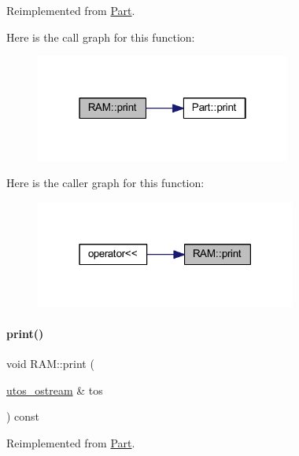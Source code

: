 Reimplemented from \mbox{\hyperlink{class_part_a4fa402b8e8fd4236ff773a7697ab2bc3}{Part}}.

Here is the call graph for this function\+:
\nopagebreak
\begin{figure}[H]
\begin{center}
\leavevmode
\includegraphics[width=238pt]{class_r_a_m_a2f226659cbc23f841d73525572ba9574_cgraph}
\end{center}
\end{figure}
Here is the caller graph for this function\+:
\nopagebreak
\begin{figure}[H]
\begin{center}
\leavevmode
\includegraphics[width=243pt]{class_r_a_m_a2f226659cbc23f841d73525572ba9574_icgraph}
\end{center}
\end{figure}
\mbox{\label{class_r_a_m_a11a874dd6cf99454efd6b7a1d20a3737}} 
\paragraph{\texorpdfstring{print()}{print()}\hspace{0.1cm}{\footnotesize\ttfamily [2/4]}}
{\footnotesize\ttfamily void R\+A\+M\+::print (\begin{DoxyParamCaption}\item[{\mbox{\hyperlink{structutos__ostream}{utos\+\_\+ostream}} \&}]{tos }\end{DoxyParamCaption}) const\hspace{0.3cm}{\ttfamily [virtual]}}



Reimplemented from \mbox{\hyperlink{class_part_a9ecabe44ba3415badf82c6a23617a41e}{Part}}.

